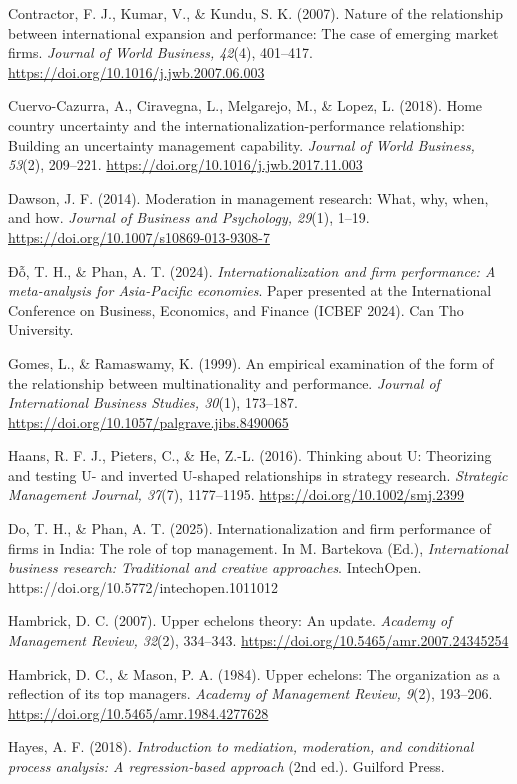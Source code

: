 \documentclass[
  12pt]{article}
\begin{document}
Contractor, F. J., Kumar, V., \& Kundu, S. K. (2007). Nature of the
relationship between international expansion and performance: The case
of emerging market firms. \emph{Journal of World Business, 42}(4),
401--417. \url{https://doi.org/10.1016/j.jwb.2007.06.003}

Cuervo-Cazurra, A., Ciravegna, L., Melgarejo, M., \& Lopez, L. (2018).
Home country uncertainty and the internationalization-performance
relationship: Building an uncertainty management capability.
\emph{Journal of World Business, 53}(2), 209--221.
\url{https://doi.org/10.1016/j.jwb.2017.11.003}

Dawson, J. F. (2014). Moderation in management research: What, why,
when, and how. \emph{Journal of Business and Psychology, 29}(1), 1--19.
\url{https://doi.org/10.1007/s10869-013-9308-7}

Đỗ, T. H., \& Phan, A. T. (2024). \emph{Internationalization and firm
performance: A meta-analysis for Asia-Pacific economies}. Paper
presented at the International Conference on Business, Economics, and
Finance (ICBEF 2024). Can Tho University.

Gomes, L., \& Ramaswamy, K. (1999). An empirical examination of the form
of the relationship between multinationality and performance.
\emph{Journal of International Business Studies, 30}(1), 173--187.
\url{https://doi.org/10.1057/palgrave.jibs.8490065}

Haans, R. F. J., Pieters, C., \& He, Z.-L. (2016). Thinking about U:
Theorizing and testing U- and inverted U-shaped relationships in
strategy research. \emph{Strategic Management Journal, 37}(7),
1177--1195. \url{https://doi.org/10.1002/smj.2399}

Do, T. H., \& Phan, A. T. (2025). Internationalization and firm
performance of firms in India: The role of top management. In M.
Bartekova (Ed.), \emph{International business research: Traditional and
creative approaches}. IntechOpen.
https://doi.org/10.5772/intechopen.1011012

Hambrick, D. C. (2007). Upper echelons theory: An update. \emph{Academy
of Management Review, 32}(2), 334--343.
\url{https://doi.org/10.5465/amr.2007.24345254}

Hambrick, D. C., \& Mason, P. A. (1984). Upper echelons: The
organization as a reflection of its top managers. \emph{Academy of
Management Review, 9}(2), 193--206.
\url{https://doi.org/10.5465/amr.1984.4277628}

Hayes, A. F. (2018). \emph{Introduction to mediation, moderation, and
conditional process analysis: A regression-based approach} (2nd ed.).
Guilford Press.
\end{document}
